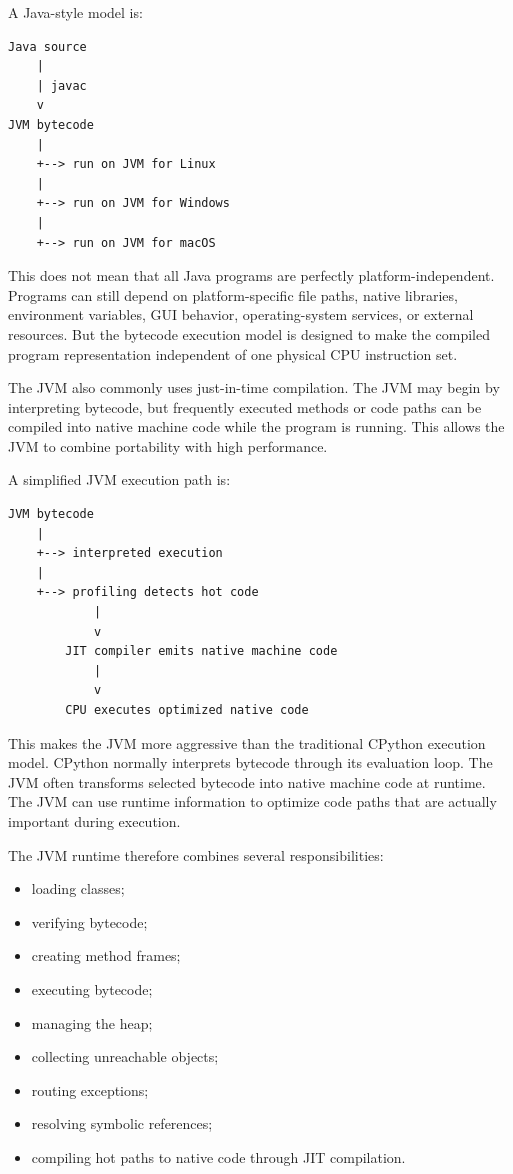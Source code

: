 A Java-style model is:

\begin{verbatim}
Java source
    |
    | javac
    v
JVM bytecode
    |
    +--> run on JVM for Linux
    |
    +--> run on JVM for Windows
    |
    +--> run on JVM for macOS
\end{verbatim}

This does not mean that all Java programs are perfectly platform-independent. Programs can still depend on platform-specific file paths, native libraries, environment variables, GUI behavior, operating-system services, or external resources. But the bytecode execution model is designed to make the compiled program representation independent of one physical CPU instruction set.

The JVM also commonly uses just-in-time compilation. The JVM may begin by interpreting bytecode, but frequently executed methods or code paths can be compiled into native machine code while the program is running. This allows the JVM to combine portability with high performance.

A simplified JVM execution path is:

\begin{verbatim}
JVM bytecode
    |
    +--> interpreted execution
    |
    +--> profiling detects hot code
            |
            v
        JIT compiler emits native machine code
            |
            v
        CPU executes optimized native code
\end{verbatim}

This makes the JVM more aggressive than the traditional CPython execution model. CPython normally interprets bytecode through its evaluation loop. The JVM often transforms selected bytecode into native machine code at runtime. The JVM can use runtime information to optimize code paths that are actually important during execution.

The JVM runtime therefore combines several responsibilities:

\begin{itemize}
    \item loading classes;
    \item verifying bytecode;
    \item creating method frames;
    \item executing bytecode;
    \item managing the heap;
    \item collecting unreachable objects;
    \item routing exceptions;
    \item resolving symbolic references;
    \item compiling hot paths to native code through JIT compilation.
\end{itemize}

